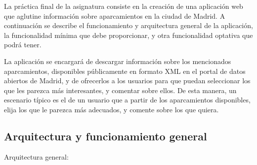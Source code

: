 La práctica final de la asignatura consiste en la creación de una aplicación web que aglutine información sobre aparcamientos en la ciudad de Madrid. A continuación se describe el funcionamiento y arquitectura general de la aplicación, la funcionalidad mínima que debe proporcionar, y otra funcionalidad optativa que podrá tener.

La aplicación se encargará de descargar información sobre los mencionados aparcamientos, disponibles públicamente en formato XML en el portal de datos abiertos de Madrid, y de ofrecerlos a los usuarios para que puedan seleccionar los que les parezca más interesantes, y comentar sobre ellos. De esta manera, un escenario típico es el de un usuario que a partir de los aparcamientos disponibles, elija los que le parezca más adecuados, y comente sobre los que quiera.

\subsection{Arquitectura y funcionamiento general}

Arquitectura general:

